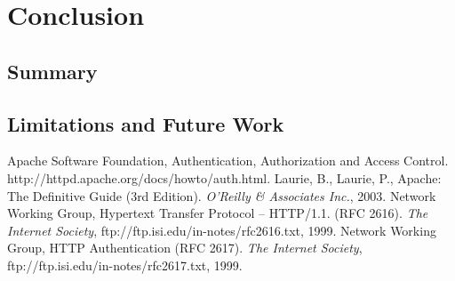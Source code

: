 \documentclass[11pt]{llncs}
\begin{document}
  \section{Conclusion}

    \subsection{Summary}

    \subsection{Limitations and Future Work}

  \begin{thebibliography}{5}
      Apache Software Foundation,
      Authentication, Authorization and Access Control.
      http://httpd.apache.org/docs/howto/auth.html.
      Laurie, B., Laurie, P.,
      Apache: The Definitive Guide (3rd Edition).
      {\em O'Reilly \& Associates Inc.}, 2003.
      Network Working Group,
      Hypertext Transfer Protocol -- HTTP/1.1. (RFC 2616).
      {\em The Internet Society},
      ftp://ftp.isi.edu/in-notes/rfc2616.txt, 1999.
      Network Working Group,
      HTTP Authentication (RFC 2617).
      {\em The Internet Society},
      ftp://ftp.isi.edu/in-notes/rfc2617.txt, 1999.
  \end{thebibliography}
\end{document}
